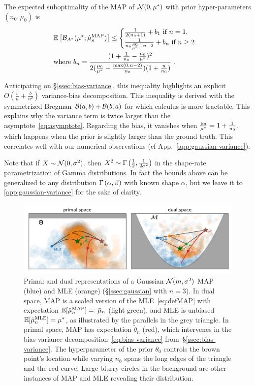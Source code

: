 \documentclass[twoside]{article}
\newcommand*{\expect}[2][]{\ensuremath{\mathbb{E}_{#1} \left[ #2 \right] }} %
\newcommand{\logpart}{A}
\newcommand{\bregmanconj}{\cB_{\logpart^*}}
\newcommand{\nat}{\theta}
\newcommand{\m}{\mu}
\begin{document}
\begin{theorem}
\label{thm:varianceMAP}
The expected suboptimality of the MAP of $\cN(0,\m^*)$ with prior hyper-parameters $(n_0,\m_0)$ is
 \begin{align}
	& \expect{\bregmanconj( \m^*; \hat \m_n^\mathrm{MAP})}
	\leq \begin{cases}
		\inv{2(n_0+1)}  +  b_1 \ \text{if}\ n=1,\\
		\frac{1}{n_0 \frac{\m_0}{\m^*} +n-2} + b_n \ \text{if}\ n\geq 2
	\end{cases}
	\label{eq:MAP_rate}\\
	& \text{where }b_n = \frac{(1 + \inv{n_0} - \frac{\m_0}{\m^*})^2}{2 (\frac{\m_0}{\m^*}+\frac{\max(0,n-2)}{n_0})(1 + \frac{n}{n_0} )} \; . \nonumber
\end{align}
\end{theorem}
Anticipating on \S\ref{ssec:bias-variance}, this inequality highlights an explicit $O(\frac{v}{n} + \frac{b}{n^2})$ variance-bias decomposition.
This inequality is derived with the symmetrized Bregman ${\mathcal B}(a,b) + {\mathcal B}(b,a)$ for which calculus is more tractable.
This explains why the variance term is twice larger than the asymptote~\eqref{eq:asymptote}.
Regarding the bias, it vanishes when $\frac{\m_0}{\m^*} =1 + \inv{n_0} $, which happens when the prior is slightly larger than the ground truth.
This correlates well with our numerical observations (cf App.~\ref{app:gaussian-variance}).

Note that if $X\sim {\mathcal N}(0,\sigma^2)$, then $X^2 \sim \Gamma\left(\frac{1}{2}, \frac{1}{2\sigma^2}\right)$ in the shape-rate parametrization of Gamma distributions. In fact the bounds above can be generalized to any distribution $\Gamma\left(\alpha, \beta\right)$ with known shape $\alpha$, but we leave it to \cref{app:gaussian-variance} for the sake of clarity.

\begin{figure}[t]
	\centering
	\includegraphics[width=.8\textwidth]{figs/thales/numerical_schema_n=3.pdf}
	\caption{
	Primal and dual representations of a Gaussian ${\mathcal N}(m,\sigma^2)$ MAP (blue) and MLE (orange) (\S\ref{ssec:gaussian} with $n=3$).
	In dual space, MAP is a scaled version of the MLE~\eqref{eq:defMAP} with expectation $\E[\hat\m_n^\text{MAP}]=:\bar \m_n$ (light green), and MLE is unbiased $\E[\hat\m_n^\text{MLE}]=\m^*$, as illustrated by the parallels in the grey triangle.
	In primal space, MAP has expectation $\tilde \nat_n$ (red), which intervenes in the bias-variance decomposition~\eqref{eq:bias-variance} from~\S\ref{ssec:bias-variance}.
	The hyperparameter of the prior $\nat_0$ controls the brown point's location while varying $n_0$ spans the long edges of the triangle and the red curve.
	Large blurry circles in the background are other instances of MAP and MLE revealing their distribution.
	}
	\label{fig:thales}
\end{figure}
\end{document}
